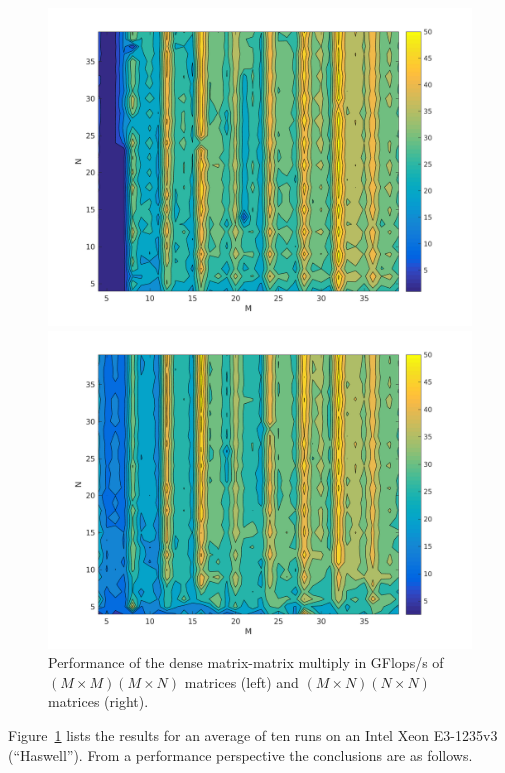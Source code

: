 \documentclass{acm_proc_article-sp}
\begin{document}
\begin{figure}[t!]
\begin{minipage}{.48\textwidth}
\includegraphics[width=\textwidth]{figures/contourSquareLeft}
\end{minipage}
\begin{minipage}{.48\textwidth}
\includegraphics[width=\textwidth]{figures/contourSquareRight}
\end{minipage}
\caption{Performance of the dense matrix-matrix multiply in GFlops/s of $(M \times M) (M \times N)$ matrices (left) and $(M \times N) (N \times N)$ matrices (right).}\label{fig:contour}
\end{figure}
Figure~\ref{fig:contour} lists the results for an average of ten runs on an Intel Xeon E3-1235v3 (``Haswell''). From a performance perspective the conclusions are as follows.
\end{document}
